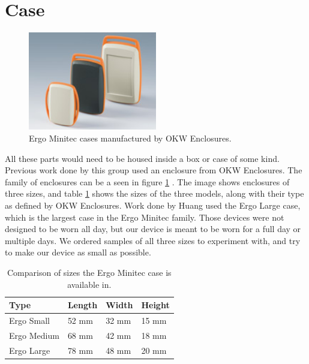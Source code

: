 \section{Case}
\label{Sec:Case}
\begin{figure}
\begin{center}
\includegraphics[width=0.5\textwidth]{images/OKWEN.jpg}
\caption{Ergo Minitec cases manufactured by OKW Enclosures.}
\label{Fig:OKWFam}
\end{center}
\end{figure}
All these parts would need to be housed inside a box or case of some kind.
Previous work done by this group used an enclosure from OKW Enclosures.
The family of enclosures can be a seen in figure \ref{Fig:OKWFam} \cite{Web:OKWPics}.
The image shows enclosures of three sizes,
and table \ref{Tab:OKWSize} shows the sizes of the three models,
along with their type as defined by OKW Enclosures.
Work done by Huang \cite{huang2013assessment} used the Ergo Large case,
which is the largest case in the Ergo Minitec family.
Those devices were not designed to be worn all day,
but our device is meant to be worn for a full day or multiple days.
We ordered samples of all three sizes to experiment with,
and try to make our device as small as possible.
\begin{table}[h]
\centering
\begin{tabular}{@{}llll@{}}
\toprule
Type & Length & Width & Height \\ \midrule
Ergo Small   & 52 mm  & 32 mm & 15 mm  \\
Ergo Medium   & 68 mm  & 42 mm & 18 mm  \\
Ergo Large   & 78 mm  & 48 mm & 20 mm  \\ \bottomrule
\end{tabular}
\caption{Comparison of sizes the Ergo Minitec case is available in.}
\label{Tab:OKWSize}
\end{table}

